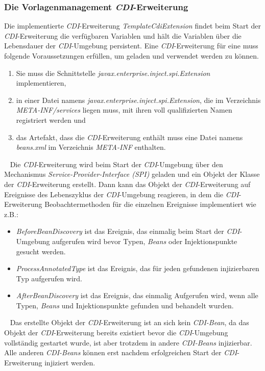 \subsubsection{Die Vorlagenmanagement \emph{CDI}-Erweiterung}
Die implementierte \emph{CDI}-Erweiterung \emph{TemplateCdiExtension} findet beim Start der \emph{CDI}-Erweiterung die verfügbaren Variablen und hält die Variablen über die Lebensdauer der \emph{CDI}-Umgebung persistent. Eine \emph{CDI}-Erweiterung für eine muss folgende Voraussetzungen erfüllen, um geladen und verwendet werden zu können. 
\begin{enumerate}
	\item Sie muss die Schnittstelle \emph{javax.enterprise.inject.spi.Extension} implementieren,
	\item in einer Datei namens \emph{javax.enterprise.inject.spi.Extension}, die im Verzeichnis \emph{META-INF/services} liegen muss, mit ihren voll qualifizierten Namen registriert werden und
	\item das Artefakt, dass die \emph{CDI}-Erweiterung enthält muss eine Datei namens \emph{beans.xml} im Verzeichnis \emph{META-INF} enthalten.
\end{enumerate}
\ \newline
Die \emph{CDI}-Erweiterung wird beim Start der \emph{CDI}-Umgebung über den Mechanismus \emph{Service-Provider-Interface (SPI)} geladen und ein Objekt der Klasse der \emph{CDI}-Erweiterung erstellt. Dann kann das Objekt der \emph{CDI}-Erweiterung auf Ereignisse des Lebenszyklus der \emph{CDI}-Umgebung reagieren, in dem die \emph{CDI}-Erweiterung Beobachtermethoden für die einzelnen Ereignisse implementiert wie z.B.:
\begin{itemize}
	\item\emph{BeforeBeanDiscovery}
	\newline
	ist das Ereignis, das einmalig beim Start der \emph{CDI}-Umgebung aufgerufen wird bevor Typen, \emph{Beans} oder Injektionspunkte gesucht werden.
	\item\emph{ProcessAnnotatedType}
	\newline
	ist das Ereignis, das für jeden gefundenen injizierbaren Typ aufgerufen wird.
	\item\emph{AfterBeanDiscovery} 
	\newline
	ist das Ereignis, das einmalig Aufgerufen wird, wenn alle Typen, \emph{Beans} und Injektionspunkte gefunden und behandelt wurden.
\end{itemize}
\ \newline
Das erstellte Objekt der \emph{CDI}-Erweiterung ist an sich kein \emph{CDI-Bean}, da das Objekt der \emph{CDI}-Erweiterung bereits existiert bevor die \emph{CDI}-Umgebung vollständig gestartet wurde, ist aber trotzdem in andere \emph{CDI-Beans} injizierbar. Alle anderen \emph{CDI-Beans} können erst nachdem erfolgreichen Start der \emph{CDI}-Erweiterung injiziert werden.

